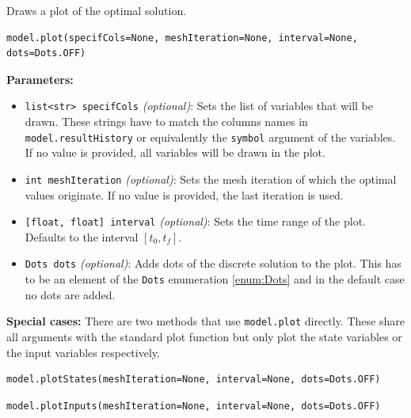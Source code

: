 \documentclass[12pt]{article}
\begin{document}
\begin{mdframed}[backgroundcolor=gray!10, roundcorner=10pt,
		linewidth=1pt]
	
	Draws a plot of the optimal solution.
 
	\begin{lstlisting}
model.plot(specifCols=None, meshIteration=None, interval=None, dots=Dots.OFF) 
		\end{lstlisting}
	\label{plot}
	\textbf{Parameters:}
	\begin{itemize}
		\item \texttt{list<str> specifCols} \emph{(optional)}: Sets the list of variables that will be drawn. These strings have to match the columns names in \texttt{model.resultHistory} or equivalently the \texttt{symbol} argument of the variables. If no value is provided, all variables will be drawn in the plot.
		
		\item \texttt{int meshIteration} \emph{(optional)}: Sets the mesh iteration of which the optimal values originate. If no value is provided, the last iteration is used.

		\item \texttt{[float, float] interval} \emph{(optional)}: Sets the time range of the plot. Defaults to the interval $[t_0, t_f]$.

		\item \texttt{Dots dots} \emph{(optional)}: Adds dots of the discrete solution to the plot. This has to be an element of the \texttt{Dots} enumeration \eqref{enum:Dots} and in the default case no dots are added.
	\end{itemize}

	\textbf{Special cases:}
		There are two methods that use \texttt{model.plot} directly. These share all arguments with the standard plot function but only plot the state variables or the input variables respectively.
		\begin{lstlisting}
model.plotStates(meshIteration=None, interval=None, dots=Dots.OFF)     
		\end{lstlisting}
		
		\begin{lstlisting}
model.plotInputs(meshIteration=None, interval=None, dots=Dots.OFF)     
		\end{lstlisting}
		

\end{mdframed}
\end{document}
